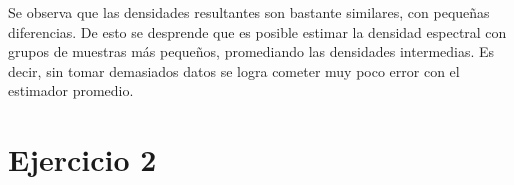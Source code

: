 Se observa que las densidades resultantes son bastante similares, con pequeñas diferencias. De esto se desprende que es posible estimar la densidad espectral con grupos de muestras más pequeños, promediando las densidades intermedias. Es decir, sin tomar demasiados datos se logra cometer muy poco error con el estimador promedio.

\section*{Ejercicio 2}




